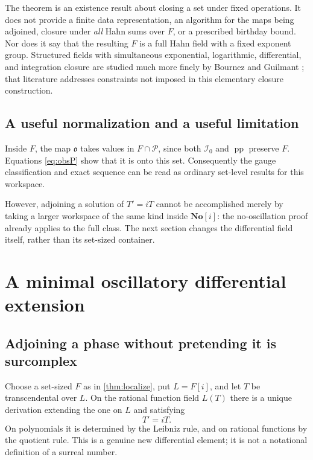 \documentclass[11pt,letterpaper]{article}
\numberwithin{equation}{section}
\theoremstyle{definition}
\theoremstyle{remark}
\newcommand{\No}{\mathbf{No}}
\newcommand{\PPi}{\mathcal P}
\newcommand{\pp}{\operatorname{pp}}
\newcommand{\Izero}{\mathcal I_0}
\newcommand{\Obs}{\mathfrak o}
\begin{document}
The theorem is an existence result about closing a set under fixed operations. It does not provide a finite data representation, an algorithm for the maps being adjoined, closure under \emph{all} Hahn sums over $F$, or a prescribed birthday bound. Nor does it say that the resulting $F$ is a full Hahn field with a fixed exponent group. Structured fields with simultaneous exponential, logarithmic, differential, and integration closure are studied much more finely by Bournez and Guilmant \cite{BG}; that literature addresses constraints not imposed in this elementary closure construction.

\subsection{A useful normalization and a useful limitation}
Inside $F$, the map $\Obs$ takes values in $F\cap\PPi$, since both $\Izero$ and $\pp$ preserve $F$. Equations \eqref{eq:obsP} show that it is onto this set. Consequently the gauge classification and exact sequence can be read as ordinary set-level results for this workspace.

However, adjoining a solution of $T'=iT$ cannot be accomplished merely by taking a larger workspace of the same kind inside $\No[i]$: the no-oscillation proof already applies to the full class. The next section changes the differential field itself, rather than its set-sized container.

\section{A minimal oscillatory differential extension}\label{sec:PV}

\subsection{Adjoining a phase without pretending it is surcomplex}
Choose a set-sized $F$ as in \cref{thm:localize}, put $L=F[i]$, and let $T$ be transcendental over $L$. On the rational function field $L(T)$ there is a unique derivation extending the one on $L$ and satisfying
\begin{equation}\label{eq:Tder}
 T'=iT.
\end{equation}
On polynomials it is determined by the Leibniz rule, and on rational functions by the quotient rule. This is a genuine new differential element; it is not a notational definition of a surreal number.
\end{document}
